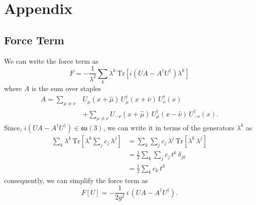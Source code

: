 \documentclass[a4paper,11pt]{article}
\begin{document}
\section{\label{appendix}Appendix}
%
%
%        
%        
%
\subsection{\label{subsec:force_term}Force Term}

We can write the force term as
%
\begin{equation}
    F = - \frac{1}{\lambda^{2}} \sum_{k} \lambda^{k} \, \mathrm{Tr}\left[ i \left(UA - A^{\dagger}U^{\dagger}\right) \lambda^{k} \right]
\end{equation}
%
where $A$ is the sum over staples
%
\begin{align}
A = \sum_{\mu\neq\nu}& U_{\mu}(x +\hat{\mu})\, U^{\dagger}_{\mu}(x + \hat{\nu}) \, U^{\dagger}_{\nu}(x) \\ 
&+ \sum_{\mu\neq\nu} U_{-\nu}(x + \hat{\mu})\, U^{\dagger}_{\mu}(x - \hat{\nu})\, U^{\dagger}_{-\nu}(x).
\end{align}
%
Since, $i\left(UA - A^{\dagger}U^{\dagger}\right) \in \mathfrak{su}(3)$,
we can write it in terms of the generators $\lambda^{k}$ as
%
\begin{align}
    \sum_{k} \lambda^{k} \,\mathrm{Tr}\left[ \lambda^{k} \sum_{j} c_{j}\, \lambda^{j}\right] &= \sum_{k}\sum_{j} c_{j}\, \lambda^{j} \,\mathrm{Tr}\left[ \lambda^{k} \, \lambda^{j}\right] \\
    &= \frac{1}{2}\sum_{k}\sum_{j} c_{j}\, t^{k}\, \delta_{jk} \\
    &= \frac{1}{2}\sum_{k} c_{k} \, t^{k}
\end{align}
%
consequently, we can simplify the force term as
%
\begin{equation}
    F[U] = - \frac{1}{2g^{2}}\, i \, \left(UA - A^{\dagger}U^{\dagger}\right).
\end{equation}
%
\end{document}
